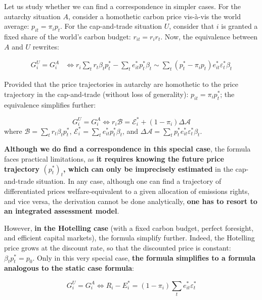 \documentclass[12pt,english]{article}
\begin{document}
Let us study whether we can find a correspondence in simpler cases. For
the autarchy situation $A$, consider a homothetic carbon price
vis-à-vis the world average: $p_{it}=\pi_i p_t$. For the cap-and-trade
situation $U$, consider that $i$ is granted a fixed share of the
world's carbon budget: $r_{it}=r_ir_t$. Now, the equivalence between
$A$ and $U$ rewrites:

$$\begin{aligned}
G^U_i = G^A_i &\Leftrightarrow r_i \sum_t r_{t} \beta_t p^*_t - \sum_t e^*_{it} p^*_t \beta_t \sim \sum_t (p^*_t - \pi_i p_t) e^*_{it}  \varepsilon^*_t \beta_t  
\end{aligned}$$

Provided that the price trajectories in autarchy are homothetic to the
price trajectory in the cap-and-trade (without loss of generality):
$p_{it}=\pi_i p^*_t$; the equivalence simplifies further:

$$G^U_i = G^A_i \Leftrightarrow r_i \mathscr{B} = \mathscr{E}^*_i + (1 - \pi_i) \Delta \mathscr{A}$$
where $\mathscr{B} = \sum_t r_{t} \beta_t p^*_t$,
$\mathscr{E}^*_i = \sum_t e^*_{it} p^*_t \beta_t$, and
$\Delta \mathscr{A} = \sum_t p^*_t e^*_{it}  \varepsilon^*_t \beta_t $.

\textbf{Although we do find a correspondence in this special case}, the
formula faces practical limitations, as \textbf{it requires knowing the
future price trajectory $(p^*_t)_t$, which can only be imprecisely
estimated} in the cap-and-trade situation. In any case, although one can
find a trajectory of differentiated prices welfare-equivalent to a given
allocation of emissions rights, and vice versa, the derivation cannot be
done analytically, \textbf{one has to resort to an integrated assessment
model}.

However, \textbf{in the Hotelling case} (with a fixed carbon budget,
perfect foresight, and efficient capital markets), the formula simplify
further. Indeed, the Hotelling price grows at the discount rate, so that
the discounted price is constant: $\beta_t p^*_t = p_0$. Only in this
very special case, \textbf{the formula simplifies to a formula analogous
to the static case formula}:

$$G^U_i = G^A_i \Leftrightarrow R_i - E^*_i = (1 - \pi_i) \sum_t e^*_{it}  \varepsilon^*_t$$
\end{document}
